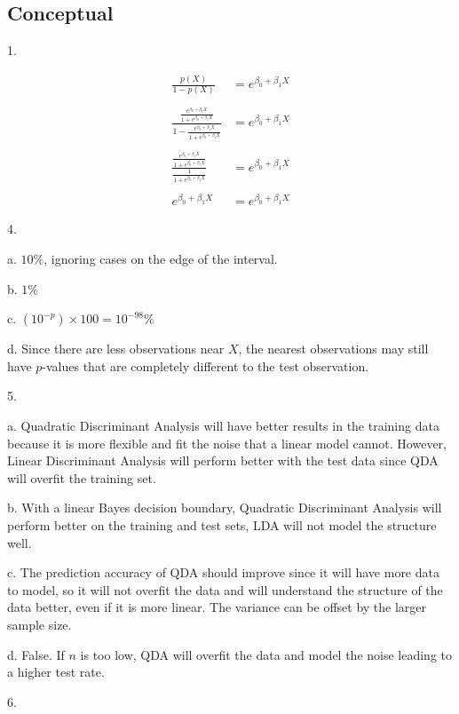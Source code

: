 \documentclass[
]{article}
\author{}
\date{}
\begin{document}
\hypertarget{header-n0}{%
\subsection{Conceptual}\label{header-n0}}

1.

\begin{align}
\frac{p(X)}{1-p(X)} &= e^{\beta_0 + \beta_1X} \\\\
\frac{  \frac{e^{\beta_0 + \beta_1X}}{1 + e^{\beta_0 + \beta_1X}}  } {1 - \frac{e^{\beta_0 + \beta_1X}}{1 + e^{\beta_0 + \beta_1X}} } &= e^{\beta_0 + \beta_1X} \\ \\
\frac{  \frac{e^{\beta_0 + \beta_1X}}{1 + e^{\beta_0 + \beta_1X}}  } {\frac{1}{1 + e^{\beta_0 + \beta_1X}} } &= e^{\beta_0 + \beta_1X} \\ \\
e^{\beta_0 + \beta_1X} &= e^{\beta_0 + \beta_1X}
\end{align}

4.

a. \(10\%\), ignoring cases on the edge of the interval.

b. \(1\%\)

c. \((10^{-p})\times 100 = 10^{-98}\%\)

d. Since there are less observations near \(X\), the nearest
observations may still have \(p\)-values that are completely different
to the test observation.

5.

a. Quadratic Discriminant Analysis will have better results in the
training data because it is more flexible and fit the noise that a
linear model cannot. However, Linear Discriminant Analysis will perform
better with the test data since QDA will overfit the training set.

b. With a linear Bayes decision boundary, Quadratic Discriminant
Analysis will perform better on the training and test sets, LDA will not
model the structure well.

c. The prediction accuracy of QDA should improve since it will have more
data to model, so it will not overfit the data and will understand the
structure of the data better, even if it is more linear. The variance
can be offset by the larger sample size.

d. False. If \(n\) is too low, QDA will overfit the data and model the
noise leading to a higher test rate.

6.
\end{document}
